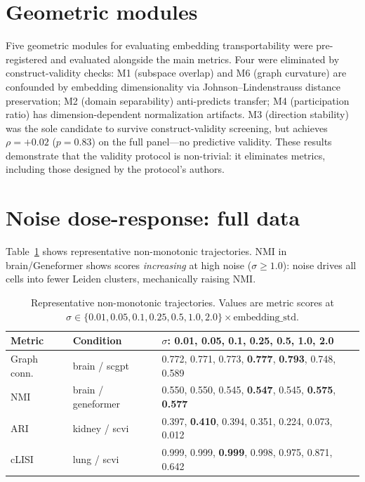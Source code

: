 \documentclass[11pt]{article}
\begin{document}
\section{Geometric modules}
\label{app:modules}

Five geometric modules for evaluating embedding transportability were
pre-registered and evaluated alongside the main metrics. Four were
eliminated by construct-validity checks: M1 (subspace overlap) and M6
(graph curvature) are confounded by embedding dimensionality via
Johnson--Lindenstrauss distance preservation; M2 (domain separability)
anti-predicts transfer; M4 (participation ratio) has
dimension-dependent normalization artifacts. M3 (direction stability)
was the sole candidate to survive construct-validity screening, but
achieves $\rho = +0.02$ ($p = 0.83$) on the full panel---no
predictive validity. These results demonstrate that the validity
protocol is non-trivial: it eliminates metrics, including those designed
by the protocol's authors.


\section{Noise dose-response: full data}
\label{app:noise}

Table~\ref{tab:app_noise_fail} shows representative non-monotonic
trajectories. NMI in brain/Geneformer shows scores \emph{increasing} at
high noise ($\sigma \geq 1.0$): noise drives all cells into fewer
Leiden clusters, mechanically raising NMI.

\begin{table}[h!]
\centering
\caption{Representative non-monotonic trajectories. Values are metric
scores at $\sigma \in \{0.01, 0.05, 0.1, 0.25, 0.5, 1.0, 2.0\} \times
\text{embedding\_std}$.}
\label{tab:app_noise_fail}
\footnotesize
\begin{tabular}{@{}llp{}@{}}
\toprule
Metric & Condition & $\sigma$: 0.01, 0.05, 0.1, 0.25, 0.5, 1.0, 2.0 \\
\midrule
Graph conn. & brain / scgpt & 0.772, 0.771, 0.773, \textbf{0.777}, \textbf{0.793}, 0.748, 0.589 \\
NMI & brain / geneformer & 0.550, 0.550, 0.545, \textbf{0.547}, 0.545, \textbf{0.575}, \textbf{0.577} \\
ARI & kidney / scvi & 0.397, \textbf{0.410}, 0.394, 0.351, 0.224, 0.073, 0.012 \\
cLISI & lung / scvi & 0.999, 0.999, \textbf{0.999}, 0.998, 0.975, 0.871, 0.642 \\
\bottomrule
\end{tabular}
\end{table}




\end{document}
